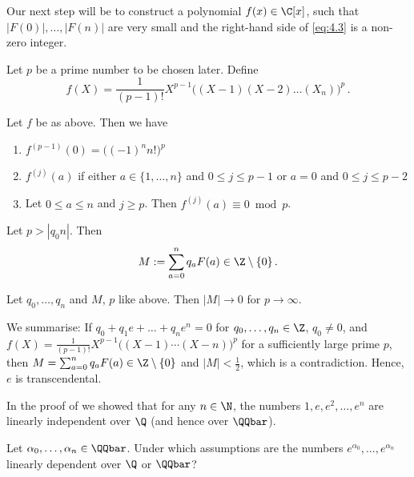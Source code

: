 Our next step will be to construct a polynomial \( f(x) \in \C[x] \), such that \( |F(0)|, \dotsc, |F(n)| \) are very small and the right-hand side of \eqref{eq:4.3} is a non-zero integer.

Let \( p \) be a prime number to be chosen later.
Define
\[ f(X) = \frac{1}{(p-1)!} X^{p-1} \big( (X-1) (X-2) \dotsc (X_n) \big)^p \,. \]

\begin{lem}
	Let \( f \) be as above.
	Then we have
	\begin{enumerate}[label=(\roman*)]
		\item \( f^{(p-1)}(0) = \big( (-1)^n n! \big)^p \)
		\item \( f^{(j)} (a) \) if either \( a \in \{1, \dotsc, n\} \) and \( 0 \leq j \leq p-1 \) or \( a=0 \) and \( 0 \leq j \leq p-2 \)
		\item Let \( 0 \leq a \leq n \) and \( j \geq p \). Then \( f^{(j)}(a) \equiv 0 \bmod p \).
	\end{enumerate}
\end{lem}

\begin{lem}
	Let \( p > |q_0 n| \).
	Then
	\[ M := \sum_{a=0}^{n} q_a F(a) \in \Z \setminus \{0\} \,. \]
\end{lem}

\begin{lem}
	Let \( q_0, \dotsc, q_n \) and \( M \), \( p \) like above.
	Then \( |M| \to 0 \) for \( p \to \infty \).
\end{lem}

We summarise: If \( q_0 + q_1e + \dots + q_ne^n = 0 \) for \( q_0, \dotsc, q_n \in \Z \), \( q_0 \neq 0 \), and \( f(X) = \frac{1}{(p-1)!} X^{p-1} \big( (X-1) \dotsm (X-n) \big)^p \) for a sufficiently large prime \( p \), then \( M = \sum_{a=0}^{n} q_a F(a) \in \Z \setminus \{0\} \) and \( |M| < \frac{1}{2} \), which is a contradiction.
Hence, \( e \) is transcendental.

\begin{rem*}
	In the proof of  we showed that for any \( n \in \N \), the numbers \( 1, e, e^2, \dotsc, e^n \) are linearly independent over \( \Q \) (and hence over \( \QQbar \)). 
\end{rem*}

\begin{frage*}
	Let \( \alpha_0, \dotsc, \alpha_n \in \QQbar \).
	Under which assumptions are the numbers \( e^{\alpha_0}, \dotsc, e^{\alpha_n} \) linearly dependent over \( \Q \) or \( \QQbar \)?
\end{frage*}

